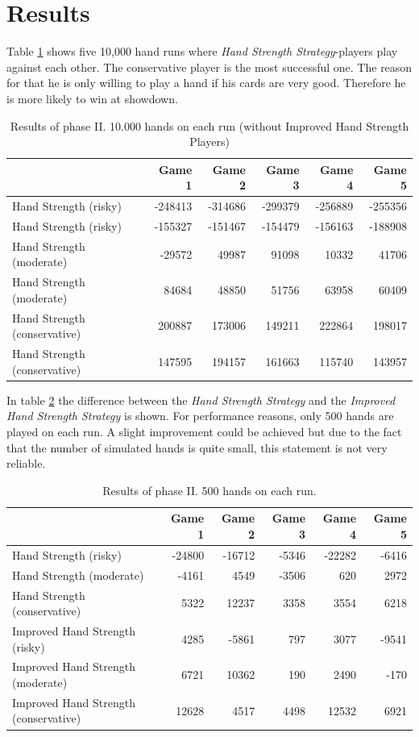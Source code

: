 \section{Results}
Table \ref{tbl:resultsPhase2a} shows five 10,000 hand runs where \emph{Hand Strength Strategy}-players play against each other. The conservative player is the most successful one. The reason for that he is only willing to play  a hand if his cards are very good. Therefore he is more likely to win at showdown.
\begin{table}[h]
	\centering
	\begin{tabular}[h]{l|r|r|r|r|r}
		& \textbf{Game 1} & \textbf{Game 2} & \textbf{Game 3} & \textbf{Game 4} & \textbf{Game 5}\\
		\hline
		Hand Strength (risky) & -248413 & -314686 & -299379 & -256889 & -255356\\
		Hand Strength (risky) & -155327 & -151467 & -154479 & -156163 & -188908\\
		Hand Strength (moderate) & -29572 & 49987 & 91098 & 10332 & 41706\\
		Hand Strength (moderate) & 84684 & 48850 & 51756 & 63958 & 60409\\
		Hand Strength (conservative) & 200887 & 173006 & 149211 & 222864 & 198017\\
		Hand Strength (conservative) & 147595 & 194157 & 161663 & 115740 & 143957\\
	\end{tabular}
	\label{tbl:resultsPhase2a}
	\caption{Results of phase II. 10.000 hands on each run (without Improved Hand Strength Players)}
\end{table}

In table \ref{tbl:resultsPhase2b} the difference between the \emph{Hand Strength Strategy} and the \emph{Improved Hand Strength Strategy} is shown. For performance reasons, only 500 hands are played on each run. A slight improvement could be achieved but due to the fact that the number of simulated hands is quite small, this statement is not very reliable.
\begin{table}[h]
	\centering
	\begin{tabular}[h]{l|r|r|r|r|r}
		& \textbf{Game 1} & \textbf{Game 2} & \textbf{Game 3} & \textbf{Game 4} & \textbf{Game 5}\\
		\hline
		Hand Strength (risky) & -24800 & -16712 & -5346 & -22282 & -6416\\
		Hand Strength (moderate) & -4161 & 4549 & -3506 & 620 & 2972\\
		Hand Strength (conservative) & 5322 & 12237 & 3358 & 3554 & 6218\\
		Improved Hand Strength (risky) & 4285 & -5861 & 797 & 3077 & -9541\\
		Improved Hand Strength (moderate) & 6721 & 10362 & 190 & 2490 & -170\\
		Improved Hand Strength (conservative) & 12628 & 4517 & 4498 & 12532 & 6921\\
	\end{tabular}
	\label{tbl:resultsPhase2b}
	\caption{Results of phase II. 500 hands on each run.}
\end{table}

